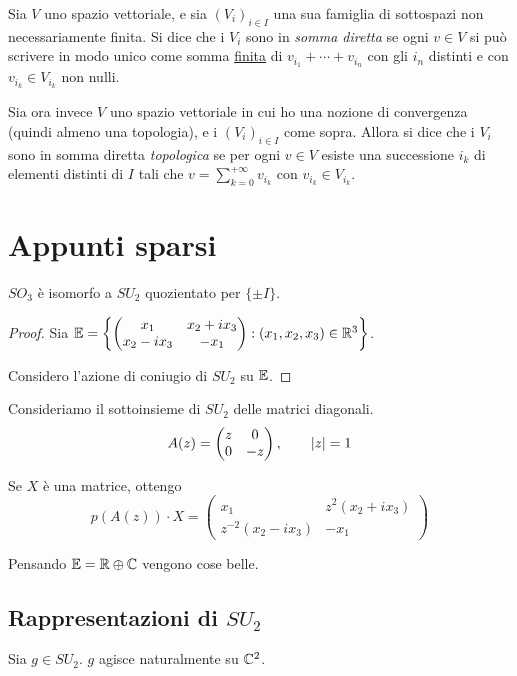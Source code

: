 	\begin{mydef}
		Sia $V$ uno spazio vettoriale, e sia $(V_i)_{i\in I}$ una sua famiglia di sottospazi non necessariamente finita.
		Si dice che i $V_i$ sono in \emph{somma diretta} se ogni $v\in V$ si può scrivere in modo unico come somma \underline{finita} di $v_{i_1} + \cdots + v_{i_n}$ con gli $i_n$ distinti e con $v_{i_k} \in V_{i_k}$ non nulli.
		
		Sia ora invece $V$ uno spazio vettoriale in cui ho una nozione di convergenza (quindi almeno una topologia), e i $(V_i)_{i\in I}$ come sopra. Allora si dice che i $V_i$ sono in somma diretta \emph{topologica} se per ogni $v\in V$ esiste una successione $i_k$ di elementi distinti di $I$ tali che $v=\sum_{k=0}^{+\infty} v_{i_k}$ con $v_{i_k} \in V_{i_k}$.
	\end{mydef}






\section{Appunti sparsi}


\begin{myprop}
 $SO_3$ è isomorfo a $SU_2$ quozientato per $\{\pm I\}$.
\end{myprop}
\begin{proof}
	Sia $\mathbb E=\left\{\left(
		\begin{matrix}
			x_1	& x_2+ix_3 \\
			x_2-ix_3 & -x_1 
		\end{matrix}
	\right): (x_1,x_2,x_3) \in \mathbb R^3\right\}$.

	Considero l'azione di coniugio di $SU_2$ su $\mathbb E$. 
\end{proof}

Consideriamo il sottoinsieme di $SU_2$ delle matrici diagonali.
\[
	A(z) = \left(
		\begin{matrix}
		z & 0 \\
		0 & -z
		\end{matrix}
	\right), \qquad \left|z\right|=1
\]

Se $X$ è una matrice, ottengo
\[
	p(A(z))\cdot X = \left( 
	\begin{matrix}
		x_1 & z^2(x_2+ix_3) \\
		z^{-2}(x_2-ix_3) & -x_1
	\end{matrix}
	\right)
\]

Pensando $\mathbb E = \mathbb R \oplus \mathbb C$ vengono cose belle.

\subsection{Rappresentazioni di $SU_2$}
	Sia $g \in SU_2$. $g$ agisce naturalmente su $\mathbb C^2$.
	
